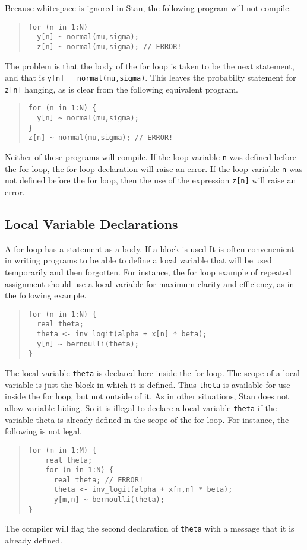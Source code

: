 \documentclass[10pt]{report}
\newcommand{\Stan}{Stan\xspace}
\newcommand{\code}[1]{{\tt #1}}
\begin{document}
Because whitespace is ignored in \Stan, the following program will
not compile.
%
\begin{quote}
\begin{Verbatim}
for (n in 1:N) 
  y[n] ~ normal(mu,sigma);
  z[n] ~ normal(mu,sigma); // ERROR!
\end{Verbatim}
\end{quote}
%
The problem is that the body of the for loop is taken to be the next
statement, and that is \code{y[n] ~ normal(mu,sigma)}.  This leaves
the probabilty statement for \code{z[n]} hanging, as is clear from
the following equivalent program.
%
\begin{quote}
\begin{Verbatim}
for (n in 1:N) {
  y[n] ~ normal(mu,sigma);
}
z[n] ~ normal(mu,sigma); // ERROR!
\end{Verbatim}
\end{quote}
%
Neither of these programs will compile. If the loop variable \code{n}
was defined before the for loop, the for-loop declaration will raise
an error.  If the loop variable \code{n} was not defined before the
for loop, then the use of the expression \code{z[n]} will raise an
error. 

\subsection{Local Variable Declarations}

A for loop has a statement as a body.  If a block is used 
It is often convenenient in writing programs to be able to define a
local variable that will be used temporarily and then forgotten.  
For instance, the for loop example of repeated assignment should
use a local variable for maximum clarity and efficiency, as in the
following example.
%
\begin{quote}
\begin{Verbatim}
for (n in 1:N) {
  real theta;
  theta <- inv_logit(alpha + x[n] * beta);
  y[n] ~ bernoulli(theta);
}
\end{Verbatim}
\end{quote}
%
The local variable \code{theta} is declared here inside the for loop.
The scope of a local variable is just the block in which it is
defined.  Thus \code{theta} is available for use inside the for loop,
but not outside of it.  As in other situations, \Stan does not allow
variable hiding.  So it is illegal to declare a local variable
\code{theta} if the variable theta is already defined in the scope of
the for loop.  For instance, the following is not legal.
%
\begin{quote}
\begin{Verbatim}
for (m in 1:M) {
    real theta;
    for (n in 1:N) {
      real theta; // ERROR!
      theta <- inv_logit(alpha + x[m,n] * beta);
      y[m,n] ~ bernoulli(theta);
}
\end{Verbatim}
\end{quote}
%
The compiler will flag the second declaration of \code{theta} with a
message that it is already defined.
\end{document}
